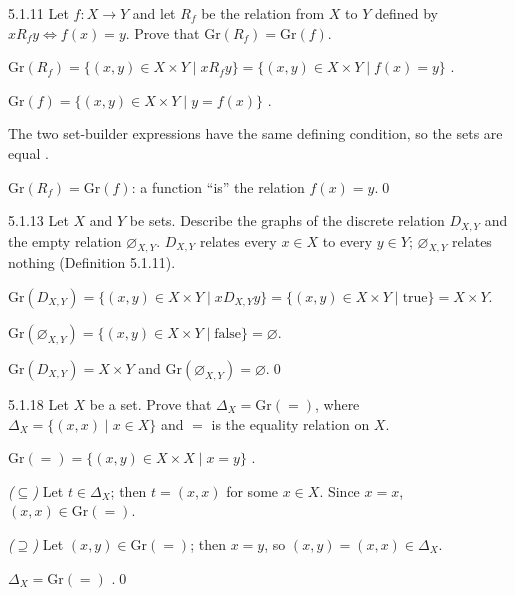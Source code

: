 \begin{bookex}[recommended]{5.1.11}
Let $f:X\to Y$ and let $R_f$ be the relation from $X$ to $Y$ defined by $x\mathrel{R_f}y\Leftrightarrow f(x)=y$. Prove that $\mathrm{Gr}(R_f)=\mathrm{Gr}(f)$.
\solution
\begin{steps}
\item $\mathrm{Gr}(R_f)=\{(x,y)\in X\times Y\mid x\mathrel{R_f}y\}=\{(x,y)\in X\times Y\mid f(x)=y\}$ .
\item $\mathrm{Gr}(f)=\{(x,y)\in X\times Y\mid y=f(x)\}$ .
\item The two set-builder expressions have the same defining condition, so the sets are equal .
\end{steps}
\conclusion $\mathrm{Gr}(R_f)=\mathrm{Gr}(f)$: a function ``is'' the relation $f(x)=y$.\qed
\end{bookex}

\begin{bookex}[essential]{5.1.13}
Let $X$ and $Y$ be sets. Describe the graphs of the discrete relation $D_{X,Y}$ and the empty relation $\varnothing_{X,Y}$.
\solution
\given $D_{X,Y}$ relates every $x\in X$ to every $y\in Y$; $\varnothing_{X,Y}$ relates nothing (Definition 5.1.11).
\begin{steps}
\item $\mathrm{Gr}(D_{X,Y})=\{(x,y)\in X\times Y\mid x\mathrel{D_{X,Y}}y\}=\{(x,y)\in X\times Y\mid\text{true}\}=X\times Y$.
\item $\mathrm{Gr}(\varnothing_{X,Y})=\{(x,y)\in X\times Y\mid\text{false}\}=\varnothing$.
\end{steps}
\answer $\mathrm{Gr}(D_{X,Y})=X\times Y$ and $\mathrm{Gr}(\varnothing_{X,Y})=\varnothing$.\qed
\end{bookex}

\begin{bookex}[recommended]{5.1.18}
Let $X$ be a set. Prove that $\Delta_X=\mathrm{Gr}(=)$, where $\Delta_X=\{(x,x)\mid x\in X\}$ and $=$ is the equality relation on $X$.
\solution
\begin{steps}
\item $\mathrm{Gr}(=)=\{(x,y)\in X\times X\mid x=y\}$ .
\item \emph{($\subseteq$)} Let $t\in\Delta_X$; then $t=(x,x)$ for some $x\in X$. Since $x=x$, $(x,x)\in\mathrm{Gr}(=)$.
\item \emph{($\supseteq$)} Let $(x,y)\in\mathrm{Gr}(=)$; then $x=y$, so $(x,y)=(x,x)\in\Delta_X$.
\end{steps}
\conclusion $\Delta_X=\mathrm{Gr}(=)$ .\qed
\end{bookex}

